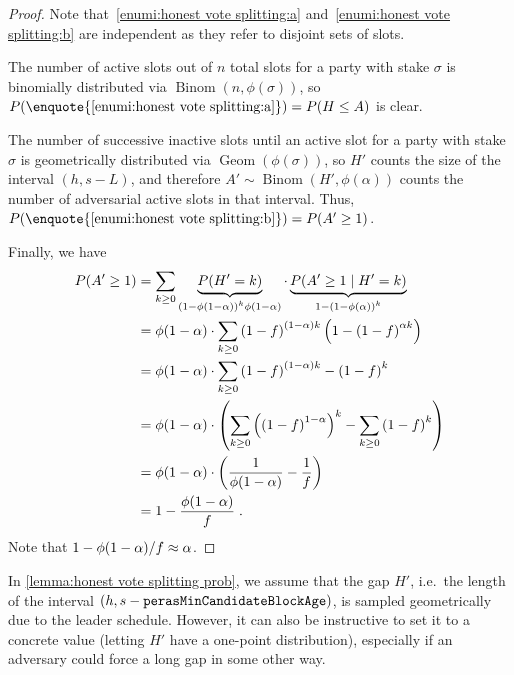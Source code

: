 \begin{proof}
  Note that~\ref{enumi:honest vote splitting:a} and~\ref{enumi:honest vote splitting:b} are independent as they refer to disjoint sets of slots.

  The number of active slots out of $n$ total slots for a party with stake $\sigma$ is binomially distributed via $\operatorname{Binom}(n,\phi(\sigma))$, so $P(\enquote{\ref{enumi:honest vote splitting:a}}) = P(H\le A)$ is clear.

  The number of successive inactive slots until an active slot for a party with stake $\sigma$ is geometrically distributed via $\operatorname{Geom}(\phi(\sigma))$, so $H'$ counts the size of the interval $(h,s-L)$, and therefore $A' \sim \operatorname{Binom}(H',\phi(\alpha))$ counts the number of adversarial active slots in that interval.
  Thus, $P(\enquote{\ref{enumi:honest vote splitting:b}}) = P(A'\ge 1)$.

  Finally, we have
  \begin{align*}
    P(A' \ge 1) &= \sum_{k\ge 0} \underbrace{P(H' = k)}_{{(1-\phi(1-\alpha))}^k \phi(1-\alpha)} \cdot \underbrace{P(A' \ge 1 \mid H' = k)}_{1-{(1-\phi(\alpha))}^k} \\
                &= \phi(1-\alpha)\cdot \sum_{k\ge 0} {(1-f)}^{(1-\alpha)k} \left( 1- {(1-f)}^{\alpha k} \right) \\
                &= \phi(1-\alpha)\cdot\sum_{k\ge 0} {(1-f)}^{(1-\alpha)k} - {(1-f)}^k \\
                &= \phi(1-\alpha)\cdot \left(\sum_{k\ge 0} {\left({(1-f)}^{1-\alpha}\right)}^k - \sum_{k\ge 0} {(1-f)}^k \right) \\
                &= \phi(1-\alpha)\cdot \left( \frac1{\phi(1-\alpha)} - \frac1{f} \right) \\
                &= 1 - \frac{\phi(1-\alpha)}{f} \;.
  \end{align*}
  Note that $1-\phi(1-\alpha) / f \approx \alpha$.
\end{proof}

In \cref{lemma:honest vote splitting prob}, we assume that the gap $H'$, i.e.\ the length of the interval $(h,s-\mathtt{perasMinCandidateBlockAge})$, is sampled geometrically due to the leader schedule.
However, it can also be instructive to set it to a concrete value (letting $H'$ have a one-point distribution), especially if an adversary could force a long gap in some other way.

